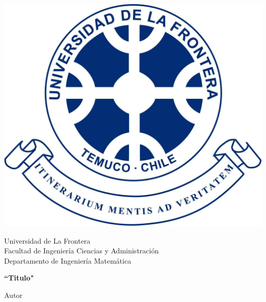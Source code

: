 \documentclass[letter]{article}%
\begin{document}
\begin{titlepage}
	\includegraphics[scale=0.15]{images/logoUFRO.jpg}
	\vspace{-2cm}
	\begin{center}
		Universidad de La Frontera\\
		Facultad de Ingeniería Ciencias y Administración\\
		Departamento de Ingeniería Matemática
	\end{center}
	\vspace{7.5cm}
	\begin{center}
		\begin{Large}
			\textbf{``Titulo"}
		\end{Large}
	\end{center}
	\vspace{10cm}
	\begin{center}
		{\large Autor\\ \the\year}
	\end{center}
\end{titlepage}
\end{document}
